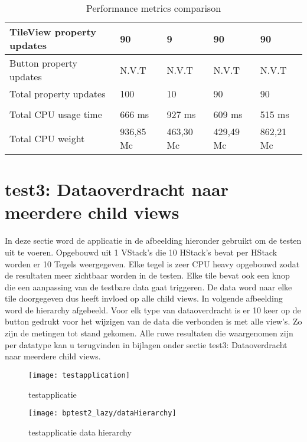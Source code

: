 \begin{table}[H]
\begin{tabularx}{\textwidth}{|>{\raggedright\arraybackslash}m{5cm}|X|X|X|X|}
        \hline
        TileView property updates & 90 & 9 & 90 & 90 \\
        \hline
        Button property updates & N.V.T & N.V.T & N.V.T & N.V.T \\
        \hline
        Total property updates & 100 & 10 & 90 & 90 \\
        \hline
        \multicolumn{5}{|l|}{\textbf{CPU usage}} \\
        \hline
        Total CPU usage time & 666 ms & 927 ms & 609 ms & 515 ms \\
        \hline
        Total CPU weight & 936,85 Mc & 463,30 Mc & 429,49 Mc & 862,21 Mc \\
        \hline
    \end{tabularx}
    \caption{Performance metrics comparison}
    \label{tab:performance_metrics2}
\end{table}


\section{test3: Dataoverdracht naar meerdere child views}
In deze sectie word de applicatie in de afbeelding hieronder gebruikt om de testen uit te voeren. Opgebouwd uit 1 VStack's die 10 HStack's bevat per HStack worden er 10 Tegels weergegeven. Elke tegel is zeer CPU heavy opgebouwd zodat de resultaten meer zichtbaar worden in de testen. Elke tile bevat ook een knop die een aanpassing van de testbare data gaat triggeren. De data word naar elke tile doorgegeven dus heeft invloed op alle child views. In volgende afbeelding word de hierarchy afgebeeld. Voor elk type van dataoverdracht is er 10 keer op de button gedrukt voor het wijzigen van de data die verbonden is met alle view's. Zo zijn de metingen tot stand gekomen. Alle ruwe resultaten die waargenomen zijn per datatype kan u terugvinden in bijlagen onder sectie test3: Dataoverdracht naar meerdere child views.
\begin{figure}[H]
    \centering
    \texttt{[image: testapplication]} 
    \caption{testapplicatie}
    \label{fig:testapplication3}
\end{figure}
\begin{figure}[H]
    \centering
    \texttt{[image: bptest2\_lazy/dataHierarchy]} 
    \caption{testapplicatie data hierarchy}
    \label{fig:testapplicationHierarchy3}
\end{figure}



